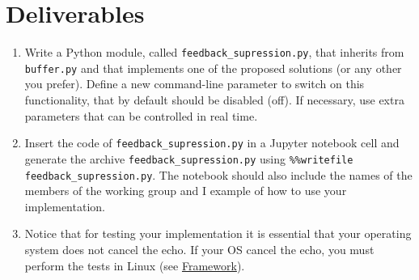 \section{Deliverables}

\begin{enumerate}
\item Write a Python module, called \texttt{feedback\_supression.py},
  that inherits from \texttt{buffer.py} and that implements one of the
  proposed solutions (or any other you prefer). Define a new
  command-line parameter to switch on this functionality, that by
  default should be disabled (off). If necessary, use extra parameters
  that can be controlled in real time.
\item Insert the code of \texttt{feedback\_supression.py} in a Jupyter
  notebook cell and generate the archive
  \texttt{feedback\_supression.py} using \texttt{\%\%writefile
    feedback\_supression.py}. The notebook should also include the
  names of the members of the working group and I example of how to
  use your implementation.
\item Notice that for testing your implementation it is essential that
  your operating system does not cancel the echo. If your OS cancel
  the echo, you must perform the tests in Linux (see
  \href{https://tecnologias-multimedia.github.io/contents/framework/}{Framework}).
\end{enumerate}

